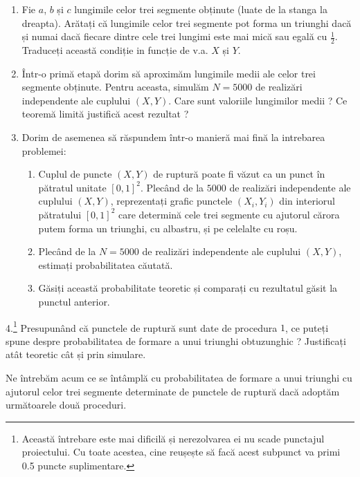 \documentclass[]{article}
\let\rmarkdownfootnote\footnote%
\def\footnote{\protect\rmarkdownfootnote}
\begin{document}
\begin{enumerate}
\def\labelenumi{\arabic{enumi}.}
\item
  Fie \(a\), \(b\) și \(c\) lungimile celor trei segmente obținute
  (luate de la stanga la dreapta). Arătați că lungimile celor trei
  segmente pot forma un triunghi dacă și numai dacă fiecare dintre cele
  trei lungimi este mai mică sau egală cu \(\frac{1}{2}\). Traduceți
  această condiție in funcție de v.a. \(X\) și \(Y\).
\item
  Într-o primă etapă dorim să aproximăm lungimile medii ale celor trei
  segmente obținute. Pentru aceasta, simulăm \(N=5000\) de realizări
  independente ale cuplului \((X,Y)\). Care sunt valoriile lungimilor
  medii ? Ce teoremă limită justifică acest rezultat ?
\item
  Dorim de asemenea să răspundem într-o manieră mai fină la intrebarea
  problemei:

  \begin{enumerate}
  \def\labelenumii{\alph{enumii}.}
  \item
    Cuplul de puncte \((X,Y)\) de ruptură poate fi văzut ca un punct în
    pătratul unitate \([0,1]^2\). Plecând de la \(5000\) de realizări
    independente ale cuplului \((X,Y)\), reprezentați grafic punctele
    \((X_i,Y_i)\) din interiorul pătratului \([0,1]^2\) care determină
    cele trei segmente cu ajutorul cărora putem forma un triunghi, cu
    albastru, și pe celelalte cu roșu.
  \item
    Plecând de la \(N=5000\) de realizări independente ale cuplului
    \((X,Y)\), estimați probabilitatea căutată.
  \item
    Găsiți această probabilitate teoretic și comparați cu rezultatul
    găsit la punctul anterior.
  \end{enumerate}
\end{enumerate}

4.\footnote{Această întrebare este mai dificilă și nerezolvarea ei nu
  scade punctajul proiectului. Cu toate acestea, cine reușește să facă
  acest subpunct va primi 0.5 puncte suplimentare.} Presupunând că
punctele de ruptură sunt date de procedura \(1\), ce puteți spune despre
probabilitatea de formare a unui triunghi obtuzunghic ? Justificați atât
teoretic cât și prin simulare.

Ne întrebăm acum ce se întâmplă cu probabilitatea de formare a unui
triunghi cu ajutorul celor trei segmente determinate de punctele de
ruptură dacă adoptăm următoarele două proceduri.
\end{document}
